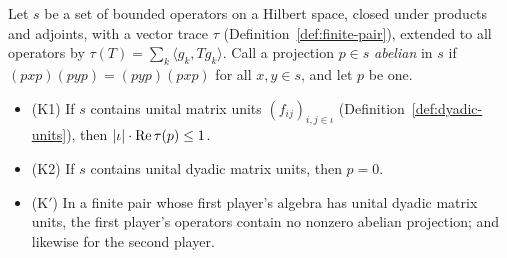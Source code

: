 \begin{theorem}
\label{thm:no-abelian-dyadic}
\leanok
Let $s$ be a set of bounded operators on a Hilbert space, closed under products and adjoints, with
a vector trace $\tau$ (Definition~\ref{def:finite-pair}), extended to all operators by $\tau(T) =
\sum_k \langle g_k, T g_k \rangle$. Call a projection $p \in s$ \emph{abelian} in $s$ if $(pxp)(pyp)
= (pyp)(pxp)$ for all $x, y \in s$, and let $p$ be one.
\begin{itemize}
\item (K1) If $s$ contains unital matrix units $(f_{ij})_{i, j \in \iota}$
  (Definition~\ref{def:dyadic-units}), then $\left\vert {\iota} \right\vert \cdot \mathrm{Re}\, \tau(p) \leq 1$.
\item (K2) If $s$ contains unital dyadic matrix units, then $p = 0$.
\item (K$'$) In a finite pair whose first player's algebra has unital dyadic matrix units, the first
  player's operators contain no nonzero abelian projection; and likewise for the second player.
\end{itemize}
\end{theorem}

